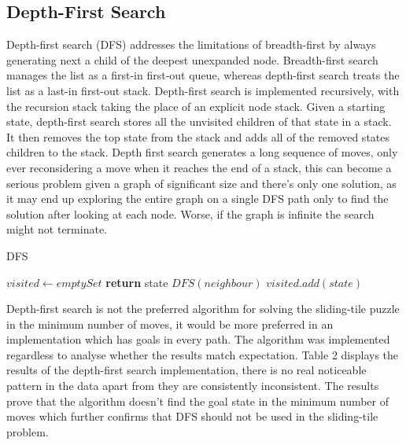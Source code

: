\documentclass[final]{cmpreport}
\begin{document}
\subsection{Depth-First Search}
Depth-first search (DFS) addresses the limitations of breadth-first by always generating next a child of the deepest unexpanded node. Breadth-first search manages the list as a first-in first-out queue, whereas depth-first search treats the list as a last-in first-out stack. Depth-first search is implemented recursively, with the recursion stack taking the place of an explicit node stack. Given a starting state, depth-first search stores all the unvisited children of that state in a stack. It then removes the top state from the stack and adds all of the removed states children to the stack. Depth first search generates a long sequence of moves, only ever reconsidering a move when it reaches the end of a stack, this can become a serious problem given a graph of significant size and there's only one solution, as it may end up exploring the entire graph on a single DFS path only to find the solution after looking at each node. Worse, if the graph is infinite the search might not terminate.

\begin{algorithm}
	\caption{DFS}\label{dfs}
	\begin{algorithmic}[1]
		\State $visited \gets emptySet$
		\State \textbf{return} state
		\EndIf
		\State	$DFS(neighbour)$
		\EndIf
		\EndFor
		\State $visited.add(state)$
		\EndProcedure
	\end{algorithmic}
\end{algorithm}


Depth-first search is not the preferred algorithm for solving the sliding-tile puzzle in the minimum number of moves, it would be more preferred in an implementation which has goals in every path. The algorithm was implemented regardless to analyse whether the results match expectation. Table 2 displays the results of the depth-first search implementation, there is no real noticeable pattern in the data apart from they are consistently inconsistent. The results prove that the algorithm doesn't find the goal state in the minimum number of moves which further confirms that DFS should not be used in the sliding-tile problem. 

  
\end{document}
